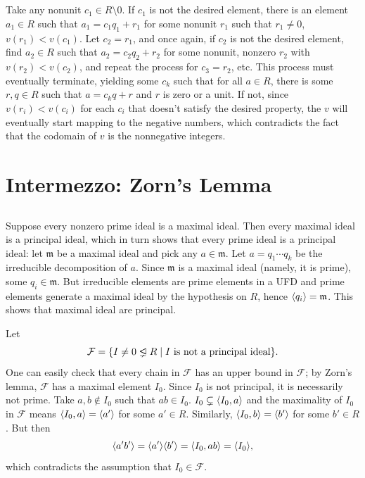 \documentclass[12pt]{article}
\begin{document}
\setcounter{subsection}{16} 
\subsection{} 
Take any nonunit $c_1 \in R \setminus 0$. 
If $c_1$ is not the desired element, there is an element $a_1 \in R$ such that $a_1 = c_1 q_1 + r_1$ for some nonunit $r_1$ such that $r_1 \neq 0$, $v(r_1) < v(c_1)$. 
Let $c_2 = r_1$, and once again, if $c_2$ is not the desired element, find $a_2 \in R$ such that $a_2 = c_2 q_2 + r_2$ for some nonunit, nonzero $r_2$ with $v(r_2) < v(c_2)$, and repeat the process for $c_3 = r_2$, etc. 
This process must eventually terminate, yielding some $c_k$ such that for all $a \in R$, there is some $r, q \in R$ such that $a = c_k q + r$ and $r$ is zero or a unit. 
If not, since $v(r_i) < v(c_i)$ for each $c_i$ that doesn't satisfy the desired property, the $v$ will eventually start mapping to the negative numbers, which contradicts the fact that the codomain of $v$ is the nonnegative integers. 

\newcommand{\m}{\mathfrak{m}}
\section{Intermezzo: Zorn's Lemma} 
\setcounter{subsection}{10} 
\subsection{}  
Suppose every nonzero prime ideal is a maximal ideal. 
Then every maximal ideal is a principal ideal, which in turn shows that every prime ideal is a principal ideal: 
let $\m$ be a maximal ideal and pick any $a \in \m$. 
Let $a = q_1 \cdots q_k$ be the irreducible decomposition of $a$. 
Since $\m$ is a maximal ideal (namely, it is prime), some $q_i \in \m$. 
But irreducible elements are prime elements in a UFD and prime elements generate a maximal ideal by the hypothesis on $R$, hence $\<q_i\> = \m$. 
This shows that maximal ideal are principal. 

Let 
$$\mathcal{F} = \{I \neq 0 \lhdneq R \mid I \text{ is not a principal ideal}\}.$$
One can easily check that every chain in $\mathcal{F}$ has an upper bound in $\mathcal{F}$; 
by Zorn's lemma, $\mathcal{F}$ has a maximal element $I_0$. 
Since $I_0$ is not principal, it is necessarily not prime. 
Take $a, b \notin I_0$ such that $ab \in I_0$.
$I_0 \subsetneq \langle I_0, a\rangle$ and the maximality of $I_0$ in $\mathcal{F}$ means $\langle I_0, a\rangle = \langle a'\rangle$ for some $a' \in R$. 
Similarly, $\langle I_0, b\rangle = \langle b'\rangle$ for some $b' \in R$. 
But then 
$$\langle a' b'\rangle = \langle a'\rangle \langle b'\rangle = \langle I_0, ab\rangle = \langle I_0\rangle,$$
which contradicts the assumption that $I_0 \in \mathcal{F}$. 
\end{document}
